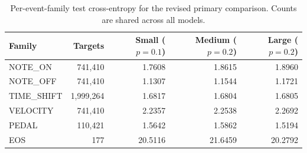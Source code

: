 \begin{table}[H]
\centering
\caption{Per-event-family test cross-entropy for the revised primary comparison. Counts are shared across all models.}
\label{tab:eventdiagnostics}
\begin{tabular}{lrrrr}
\toprule Family & Targets & Small ($p=0.1$) & Medium ($p=0.2$) & Large ($p=0.2$)\\\midrule
NOTE\_ON & 741,410 & 1.7608 & 1.8615 & 1.8960 \\
NOTE\_OFF & 741,410 & 1.1307 & 1.1544 & 1.1721 \\
TIME\_SHIFT & 1,999,264 & 1.6817 & 1.6804 & 1.6805 \\
VELOCITY & 741,410 & 2.2357 & 2.2538 & 2.2692 \\
PEDAL & 110,421 & 1.5642 & 1.5862 & 1.5194 \\
EOS & 177 & 20.5116 & 21.6459 & 20.2792 \\
\bottomrule
\end{tabular}
\end{table}
